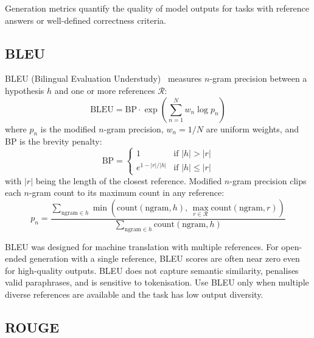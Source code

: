 Generation metrics quantify the quality of model outputs for tasks with reference answers or well-defined correctness criteria.

\subsection{BLEU}
\label{bleu}

BLEU (Bilingual Evaluation Understudy)~\cite{papineni2002bleu} measures $n$-gram precision between a hypothesis $h$ and one or more references $\mathcal{R}$: 
\begin{equation}
    \text{BLEU} = \text{BP} \cdot \exp\!\left(\sum_{n=1}^{N} w_n \log p_n\right)
\end{equation}
 where $p_n$ is the modified $n$-gram precision, $w_n = 1/N$ are uniform weights, and BP is the brevity penalty: 
\begin{equation}
    \text{BP} = \begin{cases} 1 & \text{if } |h| > |r| \\ e^{1 - |r|/|h|} & \text{if } |h| \leq |r| \end{cases}
\end{equation}
 with $|r|$ being the length of the closest reference. Modified $n$-gram precision clips each $n$-gram count to its maximum count in any reference: 
\begin{equation}
    p_n = \frac{\sum_{\text{ngram} \in h} \min\!\left(\text{count}(\text{ngram}, h),\, \max_{r \in \mathcal{R}} \text{count}(\text{ngram}, r)\right)}{\sum_{\text{ngram} \in h} \text{count}(\text{ngram}, h)}
\end{equation}

\begin{warningbox}
BLEU was designed for machine translation with multiple references. For open-ended generation with a single reference, BLEU scores are often near zero even for high-quality outputs. BLEU does not capture semantic similarity, penalises valid paraphrases, and is sensitive to tokenisation. Use BLEU only when multiple diverse references are available and the task has low output diversity.
\end{warningbox}

\subsection{ROUGE}
\label{rouge}

